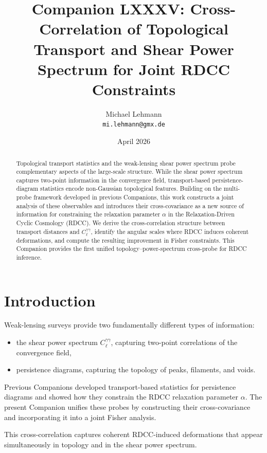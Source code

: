 \documentclass[11pt,a4paper]{article}
\title{\textbf{Companion LXXXV: Cross-Correlation of Topological Transport and Shear Power Spectrum for Joint RDCC Constraints}}
\author{Michael Lehmann \\ \texttt{mi.lehmann@gmx.de}}
\date{April 2026}
\begin{document}
\maketitle

\begin{abstract}
Topological transport statistics and the weak-lensing shear power spectrum probe 
complementary aspects of the large-scale structure. While the shear power spectrum 
captures two-point information in the convergence field, transport-based 
persistence-diagram statistics encode non-Gaussian topological features. Building 
on the multi-probe framework developed in previous Companions, this work 
constructs a joint analysis of these observables and introduces their 
cross-covariance as a new source of information for constraining the relaxation 
parameter $\alpha$ in the Relaxation-Driven Cyclic Cosmology (RDCC). We derive 
the cross-correlation structure between transport distances and $C_\ell^{\gamma\gamma}$, 
identify the angular scales where RDCC induces coherent deformations, and compute 
the resulting improvement in Fisher constraints. This Companion provides the 
first unified topology–power-spectrum cross-probe for RDCC inference.
\end{abstract}
\section{Introduction}

Weak-lensing surveys provide two fundamentally different types of information:

\begin{itemize}
    \item the shear power spectrum $C_\ell^{\gamma\gamma}$, capturing two-point 
          correlations of the convergence field,
    \item persistence diagrams, capturing the topology of peaks, filaments, and 
          voids.
\end{itemize}

Previous Companions developed transport-based statistics for persistence diagrams 
and showed how they constrain the RDCC relaxation parameter $\alpha$. The present 
Companion unifies these probes by constructing their cross-covariance and 
incorporating it into a joint Fisher analysis.

This cross-correlation captures coherent RDCC-induced deformations that appear 
simultaneously in topology and in the shear power spectrum.
\end{document}
